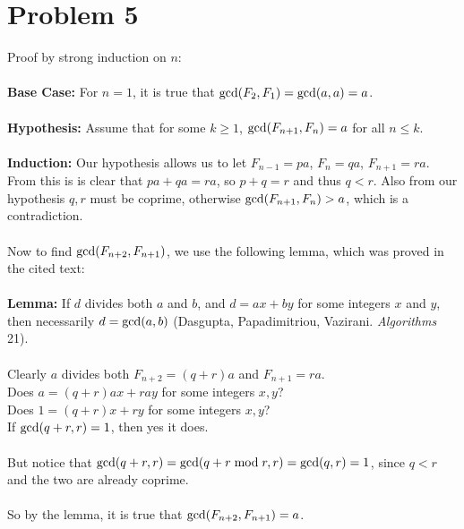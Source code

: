 \documentclass[11pt]{article}
\newcounter{problemnumber}
\let\origleft\left
\let\origright\right
\renewcommand{\left}{\mathopen{}\mathclose\bgroup\origleft}
\renewcommand{\right}{\aftergroup\egroup\origright}
\newcommand{\p}[1]{\left(#1\right)}
\renewcommand{\gcd}[1]{\text{gcd}\p{#1}}
\begin{document}
\newpage
\section*{Problem 5}
Proof by strong induction on $n$: \\\\
\textbf{Base Case:} For $n=1$, it is true that $\gcd{F_2,F_1} = \gcd{a,a} = a$. \\\\
\textbf{Hypothesis:} Assume that for some $k \geq 1$, $\gcd{F_{n+1},F_n} = a$ for all $n\leq k$. \\\\
\textbf{Induction:} Our hypothesis allows us to let $F_{n-1}=pa$, $F_n=qa$, $F_{n+1}=ra$. From this is is clear that $pa + qa = ra$, so $p+q=r$ and thus $q<r$. Also from our hypothesis $q,r$ must be coprime, otherwise $\gcd{F_{n+1},F_n} > a$, which is a contradiction. \\\\
Now to find $\gcd{F_{n+2},F_{n+1}}$, we use the following lemma, which was proved in the cited text: \\\\
\textbf{Lemma:} If $d$ divides both $a$ and $b$, and $d=ax+by$ for some integers $x$ and $y$, then necessarily $d = \gcd{a,b}$ (Dasgupta, Papadimitriou, Vazirani. \textit{Algorithms} 21). \\\\
Clearly $a$ divides both $F_{n+2} = (q+r)a$ and $F_{n+1} = ra$. \\
Does $a=(q+r)ax+ray$ for some integers $x,y$? \\
Does $1=(q+r)x+ry$ for some integers $x,y$? \\
If $\gcd{q+r,r} = 1$, then yes it does. \\\\
But notice that $\gcd{q+r,r} = \gcd{q+r \bmod r, r} = \gcd{q,r} = 1$, since $q<r$ and the two are already coprime. \\\\
So by the lemma, it is true that $\gcd{F_{n+2},F_{n+1}} = a$.


\newpage
\end{document}
